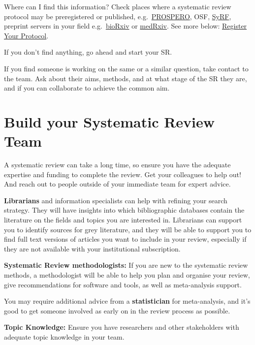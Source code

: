 \documentclass[
]{book}
\begin{document}
Where can I find this information?
Check places where a systematic review protocol may be preregistered or published, e.g.~\href{https://www.crd.york.ac.uk/prospero/}{PROSPERO}, OSF, \href{http://syrf.org.uk/}{SyRF}, preprint servers in your field e.g.~\href{https://www.biorxiv.org/}{bioRxiv} or \href{https://www.medrxiv.org/}{medRxiv}. See more below: \protect\hyperlink{register-your-protocol}{Register Your Protocol}.

If you don't find anything, go ahead and start your SR.

If you find someone is working on the same or a similar question, take contact to the team. Ask about their aims, methods, and at what stage of the SR they are, and if you can collaborate to achieve the common aim.

\hypertarget{build-your-systematic-review-team}{%
\section{Build your Systematic Review Team}\label{build-your-systematic-review-team}}

A systematic review can take a long time, so ensure you have the adequate expertise and funding to complete the review. Get your colleagues to help out! And reach out to people outside of your immediate team for expert advice.

\textbf{Librarians} and information specialists can help with refining your search strategy. They will have insights into which bibliographic databases contain the literature on the fields and topics you are interested in. Librarians can support you to identify sources for grey literature, and they will be able to support you to find full text versions of articles you want to include in your review, especially if they are not available with your institutional subscription.

\textbf{Systematic Review methodologists:}
If you are new to the systematic review methods, a methodologist will be able to help you plan and organise your review, give recommendations for software and tools, as well as meta-analysis support.

You may require additional advice from a \textbf{statistician} for meta-analysis, and it's good to get someone involved as early on in the review process as possible.

\textbf{Topic Knowledge: }
Ensure you have researchers and other stakeholders with adequate topic knowledge in your team.
\end{document}
